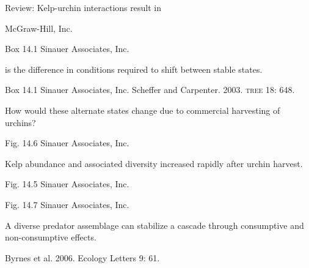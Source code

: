 \documentclass[t]{beamer}
\begin{document}
{
\begin{frame}[t]{Review: Kelp-urchin interactions result in }

	\vfilll
	
	\hfill \tiny \textcopyright McGraw-Hill, Inc.
\end{frame}
}
%
{
\begin{frame}[b]

	\vfilll
	
	\hfill \tiny Box 14.1 \textcopyright Sinauer Associates, Inc.
\end{frame}
}
%
{
\begin{frame}[b]{ is the difference in conditions required to shift between stable states.}

	\vfilll
	
	\tiny Box 14.1 \textcopyright Sinauer Associates, Inc. \hfill Scheffer and Carpenter. 2003. \textsc{tree} 18: 648.
\end{frame}
}
%
{
\begin{frame}[t]{How would these alternate states change due to commercial harvesting of urchins?}

	\vfilll
	
	\hfill \tiny Fig. 14.6 \textcopyright Sinauer Associates, Inc.
\end{frame}
}
%
{
\begin{frame}[t]{Kelp abundance and associated diversity increased rapidly after urchin harvest.}

	\vfilll
	
	\hfill \tiny Fig. 14.5 \textcopyright Sinauer Associates, Inc.
\end{frame}
}
%
{
\begin{frame}

	\vfilll
	
	\hfill \tiny Fig. 14.7 \textcopyright Sinauer Associates, Inc.
\end{frame}
}
%
{
\begin{frame}[t]{A diverse predator assemblage can stabilize a cascade through consumptive and non-consumptive effects.}

	\vfilll
	
	\hfill \tiny Byrnes et al. 2006. Ecology Letters 9: 61.
\end{frame}
}
\end{document}
